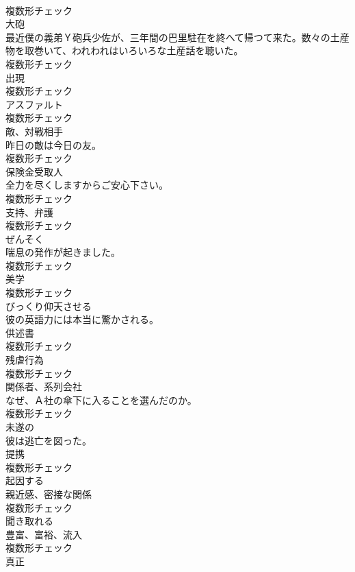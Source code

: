 \documentclass[8pt]{extreport}
\begin{document}
\begin{CJK}{UTF8}{min}
\\	複数形チェック
\\	[名詞]	大砲	
\\	最近僕の義弟Ｙ砲兵少佐が、三年間の巴里駐在を終へて帰つて来た。数々の土産物を取巻いて、われわれはいろいろな土産話を聴いた。	
\\	複数形チェック
\\	[名詞]	出現	
\\	複数形チェック
\\	[名詞]	アスファルト	
\\	複数形チェック
\\	[名詞]	敵、対戦相手	
\\	昨日の敵は今日の友。	
\\	複数形チェック
\\	[名詞]	保険金受取人	
\\	全力を尽くしますからご安心下さい。	
\\	複数形チェック
\\	[名詞]	支持、弁護	
\\	複数形チェック
\\	[名詞]	ぜんそく	
\\	喘息の発作が起きました。	
\\	複数形チェック
\\	[名詞]	美学	
\\	複数形チェック
\\	[動詞]	びっくり仰天させる	
\\	彼の英語力には本当に驚かされる。	
\\	[名詞]	供述書	
\\	複数形チェック
\\	[名詞]	残虐行為	
\\	複数形チェック
\\	[名詞]	関係者、系列会社	
\\	なぜ、Ａ社の傘下に入ることを選んだのか。	
\\	複数形チェック
\\	[形容詞]	未遂の	
\\	彼は逃亡を図った。	
\\	[名詞]	提携	
\\	複数形チェック
\\	[形容詞]	起因する	
\\	[名詞]	親近感、密接な関係	
\\	複数形チェック
\\	[形容詞]	聞き取れる	
\\	[名詞]	豊富、富裕、流入	
\\	複数形チェック
\\	[名詞]	真正	

\end{CJK}
\end{document}
